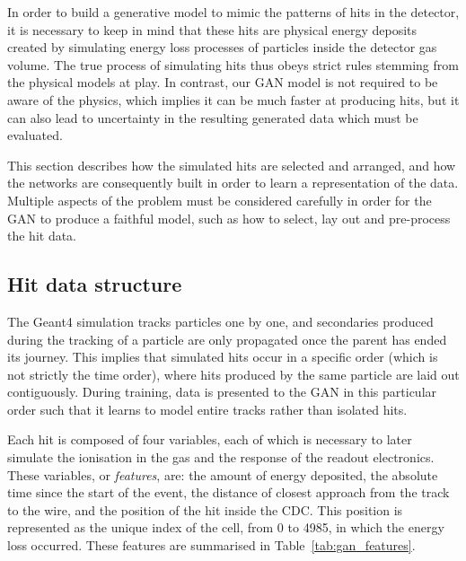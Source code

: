 In order to build a generative model to mimic the patterns of hits in the detector, it is necessary to keep in mind that these hits are physical energy deposits created by simulating energy loss processes of particles inside the detector gas volume. The true process of simulating hits thus obeys strict rules stemming from the physical models at play. In contrast, our GAN model is not required to be aware of the physics, which implies it can be much faster at producing hits, but it can also lead to uncertainty in the resulting generated data which must be evaluated.

This section describes how the simulated hits are selected and arranged, and how the networks are consequently built in order to learn a representation of the data. Multiple aspects of the problem must be considered carefully in order for the GAN to produce a faithful model, such as how to select, lay out and pre-process the hit data.


\subsection{Hit data structure}

The {\sc Geant4} simulation tracks particles one by one, and secondaries produced during the tracking of a particle are only propagated once the parent has ended its journey. This implies that simulated hits occur in a specific order (which is not strictly the time order), where hits produced by the same particle are laid out contiguously. During training, data is presented to the GAN in this particular order such that it learns to model entire tracks rather than isolated hits.

Each hit is composed of four variables, each of which is necessary to later simulate the ionisation in the gas and the response of the readout electronics. These variables, or \emph{features}, are: the amount of energy deposited, the absolute time since the start of the event, the distance of closest approach from the track to the wire, and the position of the hit inside the CDC. This position is represented as the unique index of the cell, from 0 to 4985, in which the energy loss occurred. These features are summarised in Table~\ref{tab:gan_features}.

